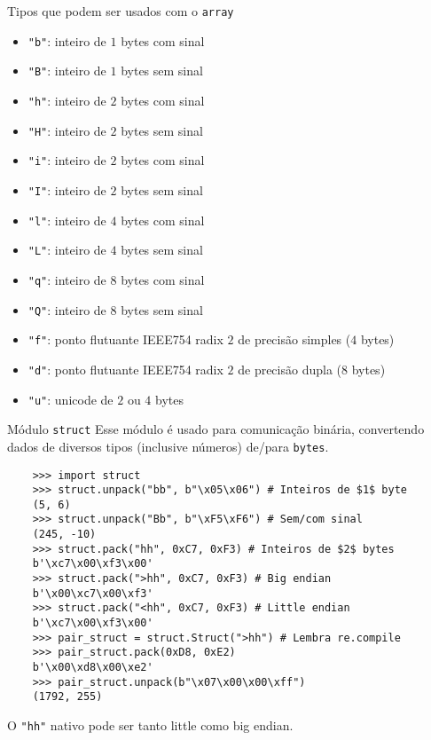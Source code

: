 \documentclass[utf8]{beamer}
\begin{document}
\begin{frame}{Tipos que podem ser usados com o \texttt{array}}
  \begin{itemize}
    \item \texttt{"b"}: inteiro de $1$ bytes com sinal
    \item \texttt{"B"}: inteiro de $1$ bytes sem sinal
    \item \texttt{"h"}: inteiro de $2$ bytes com sinal
    \item \texttt{"H"}: inteiro de $2$ bytes sem sinal
    \item \texttt{"i"}: inteiro de $2$ bytes com sinal
    \item \texttt{"I"}: inteiro de $2$ bytes sem sinal
    \item \texttt{"l"}: inteiro de $4$ bytes com sinal
    \item \texttt{"L"}: inteiro de $4$ bytes sem sinal
    \item \texttt{"q"}: inteiro de $8$ bytes com sinal
    \item \texttt{"Q"}: inteiro de $8$ bytes sem sinal
    \item \texttt{"f"}: ponto flutuante IEEE754 radix $2$
                                    de precisão simples ($4$ bytes)
    \item \texttt{"d"}: ponto flutuante IEEE754 radix $2$
                                    de precisão dupla ($8$ bytes)
    \item \texttt{"u"}: unicode de $2$ ou $4$ bytes
  \end{itemize}
\end{frame}


\begin{frame}[fragile]{Módulo \texttt{struct}}
  Esse módulo é usado para comunicação binária,
  convertendo dados de diversos tipos (inclusive números)
  de/para \texttt{bytes}.

  \begin{verbatim}
    >>> import struct
    >>> struct.unpack("bb", b"\x05\x06") # Inteiros de $1$ byte
    (5, 6)
    >>> struct.unpack("Bb", b"\xF5\xF6") # Sem/com sinal
    (245, -10)
    >>> struct.pack("hh", 0xC7, 0xF3) # Inteiros de $2$ bytes
    b'\xc7\x00\xf3\x00'
    >>> struct.pack(">hh", 0xC7, 0xF3) # Big endian
    b'\x00\xc7\x00\xf3'
    >>> struct.pack("<hh", 0xC7, 0xF3) # Little endian
    b'\xc7\x00\xf3\x00'
    >>> pair_struct = struct.Struct(">hh") # Lembra re.compile
    >>> pair_struct.pack(0xD8, 0xE2)
    b'\x00\xd8\x00\xe2'
    >>> pair_struct.unpack(b"\x07\x00\x00\xff")
    (1792, 255)
  \end{verbatim}

  O \texttt{"hh"} nativo
  pode ser tanto little como big endian.

\end{frame}
\end{document}
